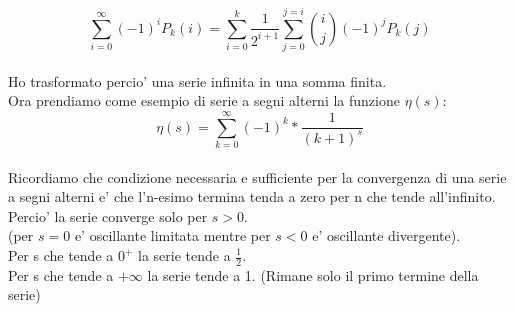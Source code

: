 \documentclass[12pt,a4paper]{article}
\begin{document}
\begin{flushleft}
\begin{equation}
\label{eq:ind10}
\sum_{i=0}^{\infty}{(-1)^{i}P_{k}(i)}=\sum_{i=0}^{k}{\frac{1}{2^{i+1}}\sum_{j=0}^{j=i}{\binom{i}{j}(-1)^{j}P_{k}(j)}}
\end{equation}
\\
\vspace{5mm}
 Ho trasformato percio' una serie infinita in una somma finita.\\
\vspace{5mm}
Ora prendiamo come esempio di serie a segni alterni la funzione $\eta(s)$:\\
\vspace{5mm}
\begin{equation}
\label{eq:ind7}
\eta(s)=\sum_{k=0}^{\infty}{(-1)^{k}*\frac{1}{(k+1)^s}}
\end{equation}
\\
\vspace{10mm}
Ricordiamo che condizione necessaria e sufficiente per la convergenza di una serie a segni alterni e' che l'n-esimo termina tenda a zero per n che tende all'infinito.\\
\vspace{10mm}
Percio' la serie converge solo per $s>0$.\\
(per $s=0$ e' oscillante limitata mentre per $s<0$ e' oscillante divergente).\\
Per s che tende a $0^+$ la serie tende a $\frac{1}{2}$.\\
Per s che tende a $+\infty$ la serie tende a 1. (Rimane solo il primo termine della serie)
\vspace{10mm}


\end{flushleft}
\end{document}
